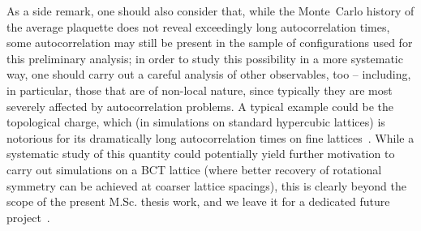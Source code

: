 As a side remark, one should also consider that, while the Monte~Carlo history of the average plaquette does not reveal exceedingly long autocorrelation times, some autocorrelation may still be present in the sample of configurations used for this preliminary analysis; in order to study this possibility in a more systematic way, one should carry out a careful analysis of other observables, too -- including, in particular, those that are of non-local nature, since typically they are most severely affected by autocorrelation problems.
A typical example could be the topological charge, which (in simulations on standard hypercubic lattices) is notorious for its dramatically long autocorrelation times on fine lattices~\cite{Schaefer:2010hu}.
While a systematic study of this quantity could potentially yield further motivation to carry out simulations on a BCT lattice (where better recovery of rotational symmetry can be achieved at coarser lattice spacings), this is clearly beyond the scope of the present M.Sc. thesis work, and we leave it for a dedicated future project~\cite{Aliberti:2024soa}.
